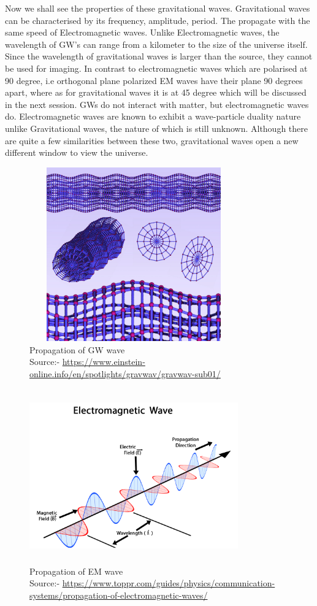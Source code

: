 Now we shall see the properties of these gravitational waves. Gravitational waves can be characterised by its frequency, amplitude, period. The propagate with the same speed of Electromagnetic waves. Unlike Electromagnetic waves, the wavelength of GW’s can range from a kilometer to the size of the universe itself. Since the wavelength of gravitational waves is larger than the source, they cannot be used for imaging. In contrast to electromagnetic waves which are polarised at 90 degree, i.e orthogonal plane polarized EM waves have their plane 90 degrees apart, where as for gravitational waves it is at 45 degree which will be discussed in the next session. GWs do not interact with matter, but electromagnetic waves do. Electromagnetic waves are known to exhibit a wave-particle duality nature unlike Gravitational waves, the nature of which is still unknown. Although there are quite a few similarities between these two, gravitational waves open a new different window to view the universe.

\begin{figure}[h]
    \centering
    \includegraphics[height= 7.5cm, width=9cm]{images.tex/GW_propagation.jpg}
    \caption{Propagation of GW wave\\ Source:- \url{https://www.einstein-online.info/en/spotlights/gravwav/gravwav-sub01/}}
\end{figure}

\begin{figure}[h]
    \centering
    \includegraphics[height= 7.5cm, width=9cm]{images.tex/EM_propagation.png}
    \caption{Propagation of EM wave\\ Source:- \url{https://www.toppr.com/guides/physics/communication-systems/propagation-of-electromagnetic-waves/}}
\end{figure}

\pagebreak

